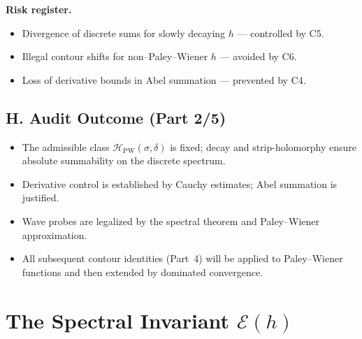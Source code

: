 \noindent\textbf{Risk register.}
\begin{itemize}
  \item Divergence of discrete sums for slowly decaying $h$ — controlled by C5.
  \item Illegal contour shifts for non–Paley–Wiener $h$ — avoided by C6.
  \item Loss of derivative bounds in Abel summation — prevented by C4.
\end{itemize}

\subsection*{H. Audit Outcome (Part 2/5)}
\label{subsec:audit-outcome-part2}

\begin{tcolorbox}[colback=gray!3,colframe=gray!65,title=Audit outcome — Part 2/5]
\begin{itemize}
  \item The admissible class $\mathcal H_{\mathrm{PW}}(\sigma,\delta)$ is fixed; decay and strip-holomorphy ensure absolute summability on the discrete spectrum.
  \item Derivative control is established by Cauchy estimates; Abel summation is justified.
  \item Wave probes are legalized by the spectral theorem and Paley–Wiener approximation.
  \item All subsequent contour identities (Part~4) will be applied to Paley–Wiener functions and then extended by dominated convergence.
\end{itemize}
\end{tcolorbox}


\section{The Spectral Invariant $\mathcal E(h)$}
\label{sec:spectral-invariant}

